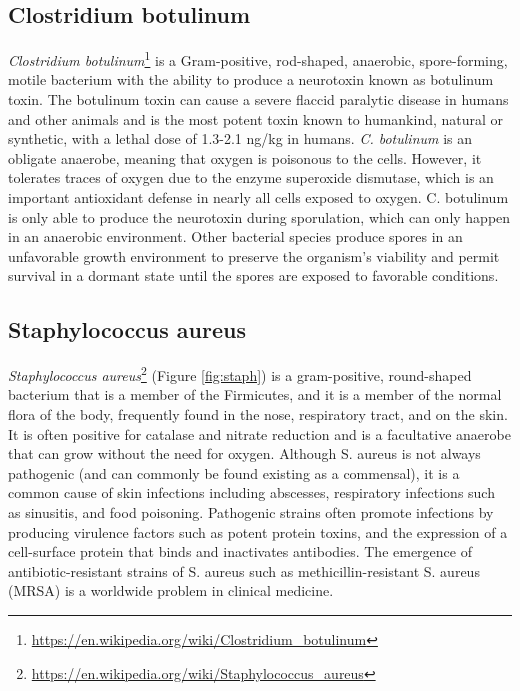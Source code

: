 \documentclass[]{book}
\let\rmarkdownfootnote\footnote%
\def\footnote{\protect\rmarkdownfootnote}
\renewcommand{\href}[2]{#2\footnote{\url{#1}}}
\theoremstyle{definition}
\theoremstyle{definition}
\theoremstyle{definition}
\theoremstyle{remark}
\begin{document}
\subsection{Clostridium botulinum}\label{clostridium-botulinum}

\href{https://en.wikipedia.org/wiki/Clostridium_botulinum}{\emph{Clostridium
botulinum}} is a Gram-positive, rod-shaped, anaerobic, spore-forming,
motile bacterium with the ability to produce a neurotoxin known as
botulinum toxin. The botulinum toxin can cause a severe flaccid
paralytic disease in humans and other animals and is the most potent
toxin known to humankind, natural or synthetic, with a lethal dose of
1.3-2.1 ng/kg in humans. \emph{C. botulinum} is an obligate anaerobe,
meaning that oxygen is poisonous to the cells. However, it tolerates
traces of oxygen due to the enzyme superoxide dismutase, which is an
important antioxidant defense in nearly all cells exposed to oxygen. C.
botulinum is only able to produce the neurotoxin during sporulation,
which can only happen in an anaerobic environment. Other bacterial
species produce spores in an unfavorable growth environment to preserve
the organism's viability and permit survival in a dormant state until
the spores are exposed to favorable conditions.

\subsection{Staphylococcus aureus}\label{staphylococcus-aureus}

\href{https://en.wikipedia.org/wiki/Staphylococcus_aureus}{\emph{Staphylococcus
aureus}} (Figure \ref{fig:staph}) is a gram-positive, round-shaped
bacterium that is a member of the Firmicutes, and it is a member of the
normal flora of the body, frequently found in the nose, respiratory
tract, and on the skin. It is often positive for catalase and nitrate
reduction and is a facultative anaerobe that can grow without the need
for oxygen. Although S. aureus is not always pathogenic (and can
commonly be found existing as a commensal), it is a common cause of skin
infections including abscesses, respiratory infections such as
sinusitis, and food poisoning. Pathogenic strains often promote
infections by producing virulence factors such as potent protein toxins,
and the expression of a cell-surface protein that binds and inactivates
antibodies. The emergence of antibiotic-resistant strains of S. aureus
such as methicillin-resistant S. aureus (MRSA) is a worldwide problem in
clinical medicine.
\end{document}
